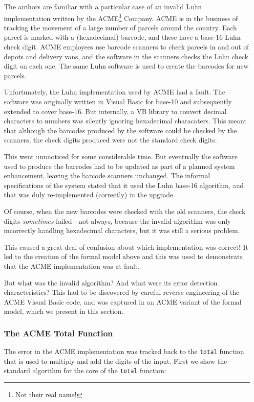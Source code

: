 \documentclass{overturerepchap}
\begin{document}
The authors are familiar with a particular case of an invalid Luhn
implementation written by the ACME\footnote{Not their real name!} Company. ACME
is in the business of tracking the movement of a large number of parcels around
the country. Each parcel is marked with a (hexadecimal) barcode, and these have
a base-16 Luhn check digit. ACME employees use barcode scanners to check
parcels in and out of depots and delivery vans, and the software in the
scanners checks the Luhn check digit on each one. The same Luhn software is
used to create the barcodes for new parcels.

Unfortunately, the Luhn implementation used by ACME had a fault. The software
was originally written in Visual Basic for base-10 and subsequently extended to
cover base-16. But internally, a VB library to convert decimal characters to
numbers was silently ignoring hexadecimal characaters. This meant that although
the barcodes produced by the software could be checked by the scanners, the
check digits produced were not the standard check digits.

This went unnnoticed for some considerable time. But eventually the software
used to produce the barcodes had to be updated as part of a planned system
enhancement, leaving the barcode scanners unchanged. The informal specifications
of the system stated that it used the Luhn base-16 algorithm, and that was duly
re-implemented (correctly) in the upgrade.

Of course, when the new barcodes were checked with the old scanners, the check
digits \emph{sometimes} failed - not always, because the invalid algorithm was
only incorrectly handling hexadecimal characters, but it was still a serious
problem.

This caused a great deal of confusion about which implementation was correct! It
led to the creation of the formal model above and this was used to demonstrate
that the ACME implementation was at fault.

But what was the invalid algorithm? And what were its error detection
characteristics? This had to be discovered by careful reverse engineering of the
ACME Visual Basic code, and was captured in an ACME variant of the formal model,
which we present in this section.

\subsubsection{The ACME Total Function}

The error in the ACME implementation was tracked back to the \texttt{total}
function that is used to multiply and add the digits of the input. First we
show the standard algorithm for the core of the \texttt{total} function:
\end{document}
